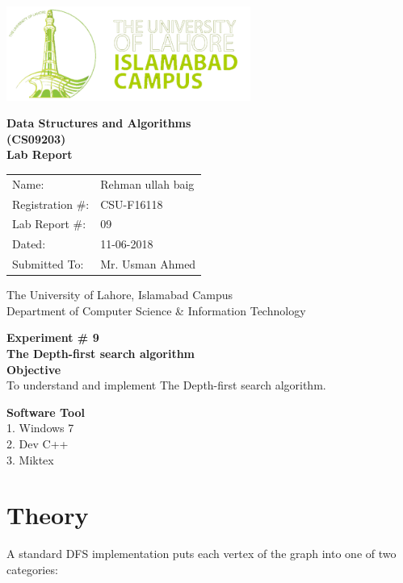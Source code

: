\documentclass[12pt]{article}            %
\begin{document}
\begin{titlepage}
    \centering
  \vfill
    \includegraphics[width=8cm]{uni_logo.png} \\ 
	\vskip2cm
    {\bfseries\Large
	Data Structures and Algorithms \\ (CS09203)\\
	
	\vskip2cm
	Lab Report 
	 
	\vskip2cm
	}    

\begin{center}
\begin{tabular}{ l l  } 

Name: & Rehman ullah baig \\ 
Registration \#: &CSU-F16118 \\ 
Lab Report \#: & 09 \\ 
 Dated:& 11-06-2018\\ 
Submitted To:& Mr. Usman Ahmed\\ 

\end{tabular}
\end{center}
    \vfill
    The University of Lahore, Islamabad Campus\\
Department of Computer Science \& Information Technology
\end{titlepage}


    
    {\bfseries\Large
\centering
	Experiment \# 9 \\

The Depth-first search algorithm\\
	
	}    
 \vskip1cm
 \textbf {Objective}\\  To understand and implement The Depth-first search algorithm.
 
 \textbf {Software Tool} \\
1. Windows 7  \\
2. Dev C++\\
3. Miktex   \\

\section{Theory }              
A standard DFS implementation puts each vertex of the graph into one of two categories:
\end{document}

